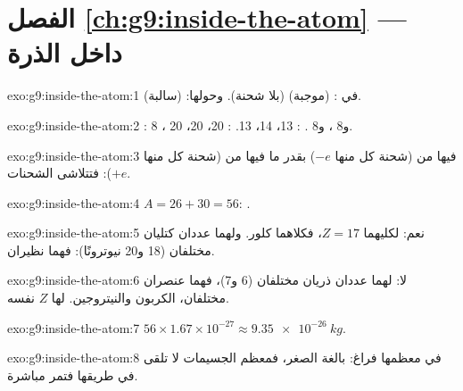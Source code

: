 \section*{الفصل \ref{ch:g9:inside-the-atom} --- داخل الذرة}

\begin{solution}{exo:g9:inside-the-atom:1}
في :  (موجبة)  (بلا شحنة). وحولها:
 (سالبة).
\end{solution}

\begin{solution}{exo:g9:inside-the-atom:2}
: 8 ، و8 ، و8 .
: 13، 14، 13. : 20، 20، 20.
\end{solution}

\begin{solution}{exo:g9:inside-the-atom:3}
فيها من  (شحنة كل منها $-e$) بقدر ما فيها من  (شحنة
كل منها $+e$): فتتلاشى الشحنات.
\end{solution}

\begin{solution}{exo:g9:inside-the-atom:4}
$A = 26 + 30 = 56$: .
\end{solution}

\begin{solution}{exo:g9:inside-the-atom:5}
نعم: لكليهما $Z = 17$، فكلاهما كلور. ولهما عددان كتليان مختلفان (18 و20
نيوترونًا): فهما نظيران.
\end{solution}

\begin{solution}{exo:g9:inside-the-atom:6}
لا: لهما عددان ذريان مختلفان (6 و7)، فهما عنصران مختلفان، الكربون
والنيتروجين.  لها $Z$ نفسه.
\end{solution}

\begin{solution}{exo:g9:inside-the-atom:7}
$56 \times 1.67 \times 10^{-27} \approx \qty{9.35e-26}{kg}$.
\end{solution}

\begin{solution}{exo:g9:inside-the-atom:8}
 في معظمها فراغ:  بالغة الصغر، فمعظم الجسيمات لا تلقى  في
طريقها فتمر مباشرة.
\end{solution}

